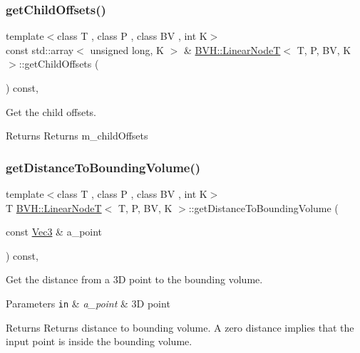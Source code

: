 \subsubsection{\texorpdfstring{get\+Child\+Offsets()}{getChildOffsets()}}
{\footnotesize\ttfamily template$<$class T , class P , class BV , int K$>$ \\
const std\+::array$<$ unsigned long, K $>$ \& \hyperlink{classBVH_1_1LinearNodeT}{B\+V\+H\+::\+Linear\+NodeT}$<$ T, P, BV, K $>$\+::get\+Child\+Offsets (\begin{DoxyParamCaption}{ }\end{DoxyParamCaption}) const\hspace{0.3cm}{\ttfamily [inline]}, {\ttfamily [noexcept]}}



Get the child offsets. 

\begin{DoxyReturn}{Returns}
Returns m\+\_\+child\+Offsets 
\end{DoxyReturn}
\mbox{\label{classBVH_1_1LinearNodeT_a2bf5b1c514a20754d527b17e1c664630}} 
\subsubsection{\texorpdfstring{get\+Distance\+To\+Bounding\+Volume()}{getDistanceToBoundingVolume()}}
{\footnotesize\ttfamily template$<$class T , class P , class BV , int K$>$ \\
T \hyperlink{classBVH_1_1LinearNodeT}{B\+V\+H\+::\+Linear\+NodeT}$<$ T, P, BV, K $>$\+::get\+Distance\+To\+Bounding\+Volume (\begin{DoxyParamCaption}\item[{const \hyperlink{classBVH_1_1LinearNodeT_a073e87d51d44b4cc243c8f90690247a6}{Vec3} \&}]{a\+\_\+point }\end{DoxyParamCaption}) const\hspace{0.3cm}{\ttfamily [inline]}, {\ttfamily [noexcept]}}



Get the distance from a 3D point to the bounding volume. 


\begin{DoxyParams}[1]{Parameters}
\mbox{\tt in}  & {\em a\+\_\+point} & 3D point \\
\hline
\end{DoxyParams}
\begin{DoxyReturn}{Returns}
Returns distance to bounding volume. A zero distance implies that the input point is inside the bounding volume. 
\end{DoxyReturn}
\mbox{\label{classBVH_1_1LinearNodeT_a1a0a50ba8c1c0601f12ae02857246b1f}} 
